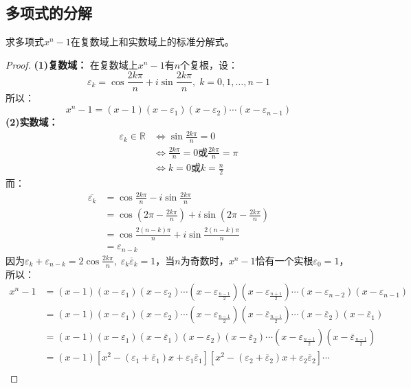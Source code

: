 \subsection{多项式的分解}
\begin{theorem}
	求多项式$x^n-1$在复数域上和实数域上的标准分解式。
\end{theorem}
\begin{proof}
	\textbf{(1)复数域：}
	在复数域上$x^n-1$有$n$个复根，设：
	\begin{equation*}
		\varepsilon_k=\cos\frac{2k\pi}{n}+i\sin\frac{2k\pi}{n},\;k=0,1,\dots,n-1
	\end{equation*}
	所以：
	\begin{equation*}
		x^n-1=(x-1)(x-\varepsilon_1)(x-\varepsilon_2)\cdots(x-\varepsilon_{n-1})
	\end{equation*}	
	\textbf{(2)实数域：}
	\begin{align*}
		\varepsilon_k\in\mathbb{R}
		&\Leftrightarrow\sin\frac{2k\pi}{n}=0 \\
		&\Leftrightarrow\frac{2k\pi}{n}=0\text{或}\frac{2k\pi}{n}=\pi \\
		&\Leftrightarrow k=0\text{或}k=\frac{n}{2} 
	\end{align*}
	而：
	\begin{align*}
		\overline{\varepsilon_k}
		&=\cos\frac{2k\pi}{n}-i\sin\frac{2k\pi}{n} \\
		&=\cos\left(2\pi-\frac{2k\pi}{n}\right)+i\sin\left(2\pi-\frac{2k\pi}{n}\right) \\
		&=\cos\frac{2(n-k)\pi}{n}+i\sin\frac{2(n-k)\pi}{n} \\
		&=\varepsilon_{n-k}
	\end{align*}
	因为$\varepsilon_k+\varepsilon_{n-k}=2\cos\frac{2k\pi}{n},\;\varepsilon_k\overline{\varepsilon}_k=1$，当$n$为奇数时，$x^n-1$恰有一个实根$\varepsilon_0=1$，所以：
	\begin{align*}
		x^n-1
		&=(x-1)(x-\varepsilon_1)(x-\varepsilon_2)\cdots(x-\varepsilon_\frac{n-1}{2})(x-\varepsilon_\frac{n+1}{2})\cdots(x-\varepsilon_{n-2})(x-\varepsilon_{n-1}) \\
		&=(x-1)(x-\varepsilon_1)(x-\varepsilon_2)\cdots(x-\varepsilon_\frac{n-1}{2})(x-\overline{\varepsilon}_\frac{n-1}{2})\cdots(x-\overline{\varepsilon}_2)(x-\overline{\varepsilon}_1) \\
		&=(x-1)(x-\varepsilon_1)(x-\overline{\varepsilon}_1)(x-\varepsilon_2)(x-\overline{\varepsilon}_2)\cdots(x-\varepsilon_\frac{n-1}{2})(x-\overline{\varepsilon}_\frac{n-1}{2}) \\
		&=(x-1)[x^2-(\varepsilon_1+\overline{\varepsilon}_1)x+\varepsilon_1\overline{\varepsilon}_1][x^2-(\varepsilon_2+\overline{\varepsilon}_2)x+\varepsilon_2\overline{\varepsilon}_2]\cdots \\

\end{align*}
\end{proof}
